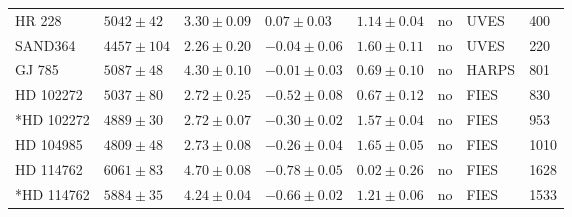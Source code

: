 \documentclass{aa}
\begin{document}
\begin{table}[htb!]
\begin{tabular}{llllllll}
       HR 228     &  $5042 \pm  42$      &  $3.30 \pm 0.09$    &  $ 0.07 \pm 0.03$    &  $1.14 \pm 0.04$             &             no              & UVES         &  400  \\  %
      SAND364     &  $4457 \pm 104$      &  $2.26 \pm 0.20$    &  $-0.04 \pm 0.06$    &  $1.60 \pm 0.11$             &             no              & UVES         &  220  \\  %
       GJ 785     &  $5087 \pm  48$      &  $4.30 \pm 0.10$    &  $-0.01 \pm 0.03$    &  $0.69 \pm 0.10$             &             no              & HARPS        &  801  \\  %
    HD 102272     &  $5037 \pm  80$      &  $2.72 \pm 0.25$    &  $-0.52 \pm 0.08$    &  $0.67 \pm 0.12$             &             no              & FIES         &  830  \\  %
   *HD 102272     &  $4889 \pm  30$      &  $2.72 \pm 0.07$	   &  $-0.30 \pm 0.02$    &  $1.57 \pm 0.04$             &             no              & FIES         &  953  \\
    HD 104985     &  $4809 \pm  48$      &  $2.73 \pm 0.08$    &  $-0.26 \pm 0.04$    &  $1.65 \pm 0.05$             &             no              & FIES         & 1010  \\  %
    HD 114762     &  $6061 \pm  83$      &  $4.70 \pm 0.08$    &  $-0.78 \pm 0.05$    &  $0.02 \pm 0.26$             &             no              & FIES         & 1628  \\  %
   *HD 114762     &  $5884 \pm  35$      &  $4.24 \pm 0.04$	   &  $-0.66 \pm 0.02$    &  $1.21 \pm 0.06$             &             no              & FIES         & 1533  \\

\end{tabular}
\end{table}
\end{document}
